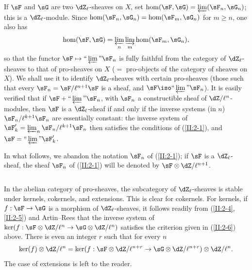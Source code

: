 \documentclass[oneside]{book}
\begin{document}
If $\sF$ and $\sG$ are two $\dZ_\ell$-sheaves on $X$, set
$\hom(\sF,\sG) = \varprojlim(\sF_n,\sG_n)$; this is a $\dZ_\ell$-module.
Since $\hom(\sF_n,\sG_n) = \hom(\sF_m,\sG_n)$ for $m\geqslant n$, one also
has
\[
  \hom(\sF,\sG) = \varprojlim_n \varinjlim_m \hom(\sF_m,\sG_n) \text{,}
\]
so that the functor $\sF\mapsto \text{``}\varprojlim\text{''}\sF_n$ is fully
faithful from the category of $\dZ_\ell$-sheaves to that of pro-sheaves on
$X$ ($=$ pro-objects of the category of sheaves on $X$). We shall use it to
identify $\dZ_\ell$-sheaves with certain pro-sheaves (those such that every
$\sF_n=\sF/\ell^{n+1}\sF$ is a sheaf, and
$\sF\iso \text{``}\varprojlim\text{''}\sF_n$). It is easily verified that if
$\sF+\text{``}\varprojlim\text{''}\sF_n$, with $\sF_n$ a constructible sheaf
of $\dZ/\ell^n$-modules, then $\sF$ is a $\dZ_\ell$-sheaf if and only if the
inverse systems (in $n$) $\sF_n/\ell^{k+1}\sF_n$ are essentially constant:
the inverse system of
$\sF_k'=\varprojlim_n\sF_n/\ell^{k+1}\sF_n$ then satisfies the conditions of
(\ref{II:2-1}), and
$\sF=\text{``}\varprojlim\text{''}\sF_k'$.

In what follows, we abandon the notation $\sF_n$ of (\ref{II:2-1}); if
$\sF$ is a $\dZ_\ell$-sheaf, the sheaf $\sF_n$ of (\ref{II:2-1}) will be
denoted by $\sF\otimes\dZ/\ell^{n+1}$.






\subsection{}\label{II:2-7}

In the abelian category of pro-sheaves, the subcategory of
$\dZ_\ell$-sheaves is stable under kernels, cokernels, and extensions. This is
clear for cokernels. For kernels, if $f:\sF\to\sG$ is a morphism of
$\dZ_\ell$-sheaves, it follows readily from
(\ref{II:2-4}, \ref{II:2-5}) and Artin--Rees that the inverse system of
$\ker(f:\sF\otimes\dZ/\ell^n\to\sG\otimes\dZ/\ell^n)$ satisfies the
criterion given in (\ref{II:2-6}) above. There is even an integer $r$ such
that for every $n$
\[
  \ker(f)\otimes\dZ/\ell^n = \ker(f:\sF\otimes\dZ/\ell^{n+r}\to\sG\otimes\dZ/\ell^{n+r})\otimes\dZ/\ell^n \text{.}
\]
The case of extensions is left to the reader.






\subsection{}\label{II:2-8}
\end{document}
